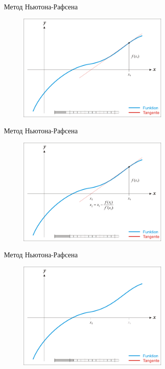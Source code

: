 \documentclass[10pt]{beamer}
\begin{document}
\begin{frame}{Метод Ньютона-Рафсена}
	\begin{figure}[htbp]
	  \includegraphics[height=150pt, keepaspectratio = true]{images/newton-3}   
	\end{figure}
\end{frame}

\begin{frame}{Метод Ньютона-Рафсена}
	\begin{figure}[htbp]
	  \includegraphics[height=150pt, keepaspectratio = true]{images/newton-4}   
	\end{figure}
\end{frame}

\begin{frame}{Метод Ньютона-Рафсена}
	\begin{figure}[htbp]
	  \includegraphics[height=150pt, keepaspectratio = true]{images/newton-5}   
	\end{figure}
\end{frame}
\end{document}

